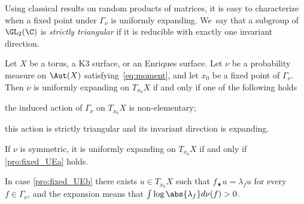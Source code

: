 Using classical results on random products of matrices, it is easy
to characterize when a fixed point under $\Gamma_\nu$ is uniformly expanding. We~say that a subgroup of $\GL_2(\C)$ is
\emph{strictly triangular} if it is reducible with exactly one invariant direction.

\begin{pro}\label{pro:fixed_UE}
Let $X$ be a torus, a K3 surface, or an Enriques surface. Let
$\nu$ be a probability measure on $\Aut(X)$ satisfying~\eqref{eq:moment}, and let $x_0$ be a fixed point of
$\Gamma_\nu$. Then $\nu$ is uniformly expanding on $T_{x_0}X$ if and only if one of the following holds
\begin{enumeratea}
\item\label{pro:fixed_UEa} the
induced action of $\Gamma_\nu$ on $ T_{x_0}X$ is non-elementary;
\item\label{pro:fixed_UEb} this action is strictly triangular and its invariant direction
is expanding.
\end{enumeratea}
If $\nu$ is symmetric, it is uniformly expanding on $T_{x_0}X$ if and only if \eqref{pro:fixed_UEa} holds.
\end{pro}

In case \eqref{pro:fixed_UEb} there exists $ u\in T_{x_0}X$ such that $f_\varstar u = \lambda_f u$ for every $f\in \Gamma_\nu$, and the expansion means that $\int \log \abs{\lambda_f} d\nu(f) >0$.

